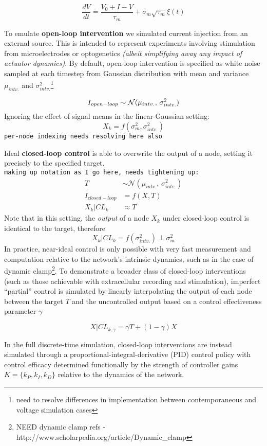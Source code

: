 \[
\frac{dV}{dt} = \frac{V_0 + I - V}{\tau_m} + \sigma_m \sqrt{\tau_m} \xi(t)
\]

To emulate \textbf{open-loop intervention} we simulated current
injection from an external source. This is intended to represent
experiments involving stimulation from microelectrodes or optogenetics
\emph{(albeit simplifying away any impact of actuator dynamics)}. By
default, open-loop intervention is specified as white noise sampled at
each timestep from Gaussian distribution with mean and variance
\(\mu_{intv.}\) and \(\sigma^2_{intv.}\)\footnote{need to resolve
  differences in implementation between contemporaneous and voltage
  simulation cases}

\[ I_{open-loop} \sim \mathcal{N}(\mu_{intv.},\,\sigma^{2}_{intv.})\\
\] Ignoring the effect of signal means in the linear-Gaussian setting:
\[ X_k = f(\sigma^2_m, \sigma^{2}_{intv.})
\] \texttt{per-node\ indexing\ needs\ resolving\ here\ also}

Ideal \textbf{closed-loop control} is able to overwrite the output of a
node, setting it precisely to the specified target.
\texttt{making\ up\ notation\ as\ I\ go\ here,\ needs\ tightening\ up:}
\[
\begin{aligned} T &\sim \mathcal{N}(\mu_{intv.},\,\sigma^{2}_{intv.}) \\ I_{closed-loop} &= f(X, T)  \\ X_k | CL_{k} &\approx T
\end{aligned}
\] Note that in this setting, the \emph{output} of a node \(X_k\) under
closed-loop control is identical to the target, therefore
\[ X_k | CL_{k} = f(\sigma^{2}_{intv.}) \perp \sigma^2_m
\] In practice, near-ideal control is only possible with very fast
measurement and computation relative to the network's intrinsic
dynamics, such as in the case of dynamic clamp\footnote{NEED dynamic
  clamp refs - http://www.scholarpedia.org/article/Dynamic\_clamp}. To
demonstrate a broader class of closed-loop interventions (such as those
achievable with extracellular recording and stimulation), imperfect
``partial'' control is simulated by linearly interpolating the output of
each node between the target \(T\) and the uncontrolled output based on
a control effectiveness parameter \(\gamma\)

\[ X | CL_{k, \gamma} = \gamma T + (1-\gamma) X
\]

In the full discrete-time simulation, closed-loop interventions are
instead simulated through a proportional-integral-derivative (PID)
control policy with control efficacy determined functionally by the
strength of controller gains \(K = \{k_P, k_I, k_D\}\) relative to the
dynamics of the network.

